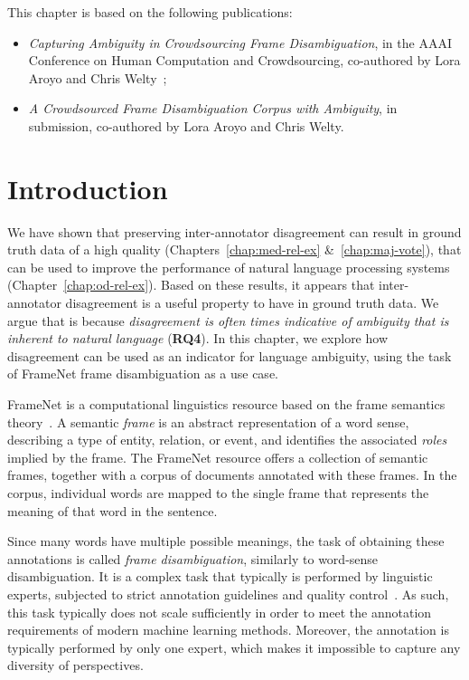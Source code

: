 This chapter is based on the following publications:
\begin{itemize}
    \item \textit{Capturing Ambiguity in Crowdsourcing Frame Disambiguation}, in the AAAI Conference on Human Computation and Crowdsourcing, co-authored by Lora Aroyo and Chris Welty~\cite{DBLP:conf/hcomp/DumitracheAW18};
    
    \item \textit{A Crowdsourced Frame Disambiguation Corpus with Ambiguity}, in submission, co-authored by Lora Aroyo and Chris Welty.
\end{itemize}


\section{Introduction}


{\color{blue} We have shown that preserving inter-annotator disagreement can result in ground truth data of a high quality (Chapters~\ref{chap:med-rel-ex} \&~\ref{chap:maj-vote}), that can be used to improve the performance of natural language processing systems (Chapter~\ref{chap:od-rel-ex}). Based on these results, it appears that inter-annotator disagreement is a useful property to have in ground truth data. We argue that is because \textit{disagreement is often times indicative of ambiguity that is inherent to natural language} (\textbf{RQ4}). In this chapter, we explore how disagreement can be used as an indicator for language ambiguity, using the task of FrameNet frame disambiguation as a use case.}

FrameNet is a computational linguistics resource based on the frame semantics theory~\cite{baker1998berkeley}. A semantic \textit{frame} is an abstract representation of a word sense, describing a type of entity, relation, or event, and identifies the associated \emph{roles} implied by the frame. The FrameNet resource offers a collection of semantic frames, together with a corpus of documents annotated with these frames. In the corpus, individual words are mapped to the single frame that represents the meaning of that word in the sentence.  

Since many words have multiple possible meanings, the task of obtaining these annotations is called \emph{frame disambiguation}, similarly to word-sense disambiguation.  It is a complex task that typically is performed by linguistic experts, subjected to strict annotation guidelines and quality control~\cite{baker2012framenet}. As such, this task typically does not scale sufficiently in order to meet the annotation requirements of modern machine learning methods. Moreover, the annotation is typically performed by only one expert, which makes it impossible to capture any diversity of perspectives.  


